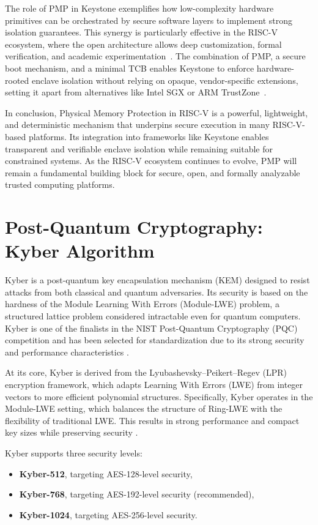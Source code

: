 The role of PMP in Keystone exemplifies how low-complexity hardware primitives can be orchestrated by secure software layers to implement strong isolation guarantees. This synergy is particularly effective in the RISC-V ecosystem, where the open architecture allows deep customization, formal verification, and academic experimentation~\cite{Survey2023}. The combination of PMP, a secure boot mechanism, and a minimal TCB enables Keystone to enforce hardware-rooted enclave isolation without relying on opaque, vendor-specific extensions, setting it apart from alternatives like Intel SGX or ARM TrustZone~\cite{dayeol2019keystone,turn0search0}.

In conclusion, Physical Memory Protection in RISC-V is a powerful, lightweight, and deterministic mechanism that underpins secure execution in many RISC-V-based platforms. Its integration into frameworks like Keystone enables transparent and verifiable enclave isolation while remaining suitable for constrained systems. As the RISC-V ecosystem continues to evolve, PMP will remain a fundamental building block for secure, open, and formally analyzable trusted computing platforms.

\section{Post-Quantum Cryptography: Kyber Algorithm}
\label{sec:kyber}

Kyber is a post-quantum key encapsulation mechanism (KEM) designed to resist attacks from both classical and quantum adversaries. Its security is based on the hardness of the Module Learning With Errors (Module-LWE) problem, a structured lattice problem considered intractable even for quantum computers. Kyber is one of the finalists in the NIST Post-Quantum Cryptography (PQC) competition and has been selected for standardization due to its strong security and performance characteristics \cite{kyber2024}.  %

At its core, Kyber is derived from the Lyubashevsky–Peikert–Regev (LPR) encryption framework, which adapts Learning With Errors (LWE) from integer vectors to more efficient polynomial structures. Specifically, Kyber operates in the Module-LWE setting, which balances the structure of Ring-LWE with the flexibility of traditional LWE. This results in strong performance and compact key sizes while preserving security \cite{kyber2024,kyber2021}. %

Kyber supports three security levels:
\begin{itemize}
    \item \textbf{Kyber-512}, targeting AES-128-level security,
    \item \textbf{Kyber-768}, targeting AES-192-level security (recommended),
    \item \textbf{Kyber-1024}, targeting AES-256-level security.
\end{itemize}


